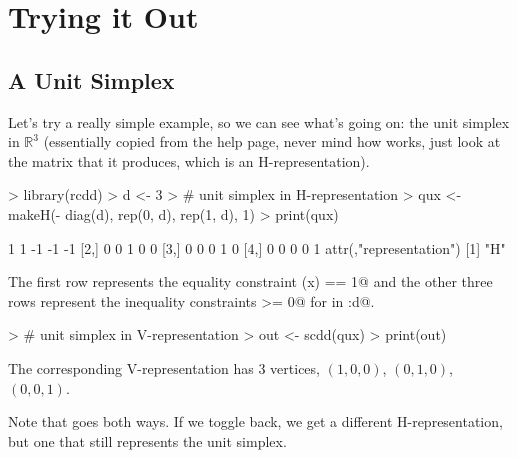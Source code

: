 \documentclass{article}
\newcommand{\real}{\mathbb{R}}
\begin{document}
\section{Trying it Out}

\subsection{A Unit Simplex}

Let's try a really simple example, so we can see what's going on:
the unit simplex in $\real^3$ (essentially copied from the \verb@scdd@
help page, never mind how \verb@makeH@ works, just look at the matrix
\verb@qux@ that it produces, which is an H-representation).
\begin{Schunk}
\begin{Sinput}
> library(rcdd)
> d <- 3
> # unit simplex in H-representation
> qux <- makeH(- diag(d), rep(0, d), rep(1, d), 1)
> print(qux)
\end{Sinput}
\begin{Soutput}
     [,1] [,2] [,3] [,4] [,5]
[1,]    1    1   -1   -1   -1
[2,]    0    0    1    0    0
[3,]    0    0    0    1    0
[4,]    0    0    0    0    1
attr(,"representation")
[1] "H"
\end{Soutput}
\end{Schunk}
The first row represents the equality constraint \verb@sum(x) == 1@
and the other three rows represent the inequality constraints \verb@x[i] >= 0@
for \verb@i@ in :d@.
\begin{Schunk}
\begin{Sinput}
> # unit simplex in V-representation
> out <- scdd(qux)
> print(out)
\end{Sinput}
\end{Schunk}
The corresponding V-representation has 3 vertices,
$(1, 0, 0)$, $(0, 1, 0)$, $(0, 0, 1)$.
\begin{Schunk}
\end{Schunk}
Note that \verb@scdd@ goes both ways.  If we toggle back,
we get a different H-representation, but one that still
represents the unit simplex.
\end{document}
